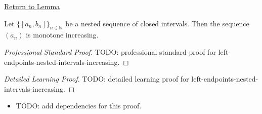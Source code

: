 \newpage
{}
\label{prf:left-endpoints-nested-intervals-increasing}

\begin{remark*}[Return]
\hyperref[lem:left-endpoints-nested-intervals-increasing]{Return to Lemma}
\end{remark*}

\begin{lemma*}
Let $\{[a_n,b_n]\}_{n\in\mathbb N}$ be a nested sequence of closed intervals.
Then the sequence $(a_n)$ is monotone increasing.
\end{lemma*}

\begin{proof}[Professional Standard Proof]
\LRAProofBodyStart
TODO: professional standard proof for left-endpoints-nested-intervals-increasing.
\end{proof}

\begin{proof}[Detailed Learning Proof]
\LRAProofBodyStart
TODO: detailed learning proof for left-endpoints-nested-intervals-increasing.
\end{proof}

\begin{remark*}
\end{remark*}

\begin{dependencies}
\begin{itemize}
  \item TODO: add dependencies for this proof.
\end{itemize}
\end{dependencies}

\clearpage
